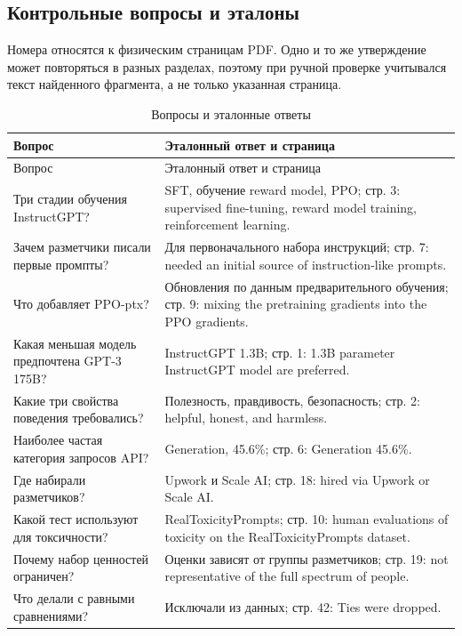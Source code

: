 \documentclass[12pt,a4paper]{article}
\begin{document}
\subsection{Контрольные вопросы и эталоны}
Номера относятся к физическим страницам PDF. Одно и то же утверждение может повторяться в разных разделах, поэтому при ручной проверке учитывался текст найденного фрагмента, а не только указанная страница.
{\small\setlength{\tabcolsep}{4pt}\begin{longtable}{L{6.8cm}L{6.8cm}}
\caption{Вопросы и эталонные ответы}\\\toprule
Вопрос & Эталонный ответ и страница\\\midrule\endfirsthead
\toprule Вопрос & Эталонный ответ и страница\\\midrule\endhead
Три стадии обучения InstructGPT? & SFT, обучение reward model, PPO; стр. 3: supervised fine-tuning, reward model training, reinforcement learning.\\
Зачем разметчики писали первые промпты? & Для первоначального набора инструкций; стр. 7: needed an initial source of instruction-like prompts.\\
Что добавляет PPO-ptx? & Обновления по данным предварительного обучения; стр. 9: mixing the pretraining gradients into the PPO gradients.\\
Какая меньшая модель предпочтена GPT-3 175B? & InstructGPT 1.3B; стр. 1: 1.3B parameter InstructGPT model are preferred.\\
Какие три свойства поведения требовались? & Полезность, правдивость, безопасность; стр. 2: helpful, honest, and harmless.\\
Наиболее частая категория запросов API? & Generation, 45.6\%; стр. 6: Generation 45.6\%.\\
Где набирали разметчиков? & Upwork и Scale AI; стр. 18: hired via Upwork or Scale AI.\\
Какой тест используют для токсичности? & RealToxicityPrompts; стр. 10: human evaluations of toxicity on the RealToxicityPrompts dataset.\\
Почему набор ценностей ограничен? & Оценки зависят от группы разметчиков; стр. 19: not representative of the full spectrum of people.\\
Что делали с равными сравнениями? & Исключали из данных; стр. 42: Ties were dropped.\\\bottomrule
\end{longtable}}
\end{document}
